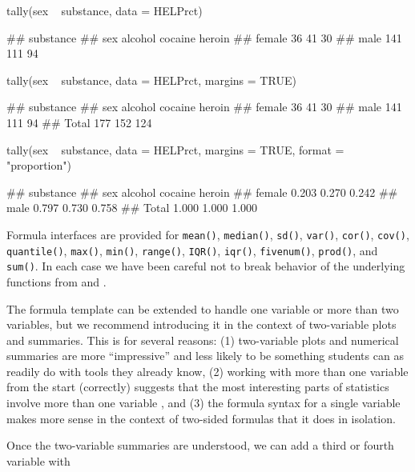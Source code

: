 \begin{Schunk}
\begin{Sinput}
tally(sex ~ substance, data = HELPrct)
\end{Sinput}
\begin{Soutput}
##         substance
## sex      alcohol cocaine heroin
##   female      36      41     30
##   male       141     111     94
\end{Soutput}
\begin{Sinput}
tally(sex ~ substance, data = HELPrct, margins = TRUE)
\end{Sinput}
\begin{Soutput}
##         substance
## sex      alcohol cocaine heroin
##   female      36      41     30
##   male       141     111     94
##   Total      177     152    124
\end{Soutput}
\begin{Sinput}
tally(sex ~ substance, data = HELPrct, margins = TRUE, format = "proportion")
\end{Sinput}
\begin{Soutput}
##         substance
## sex      alcohol cocaine heroin
##   female   0.203   0.270  0.242
##   male     0.797   0.730  0.758
##   Total    1.000   1.000  1.000
\end{Soutput}
\end{Schunk}

Formula interfaces are provided for \texttt{mean()}, \texttt{median()},
\texttt{sd()}, \texttt{var()}, \texttt{cor()}, \texttt{cov()},
\texttt{quantile()}, \texttt{max()}, \texttt{min()}, \texttt{range()},
\texttt{IQR()}, \texttt{iqr()}, \texttt{fivenum()}, \texttt{prod()}, and
\texttt{sum()}. In each case we have been careful not to break behavior
of the underlying functions from  and .

The formula template can be extended to handle one variable or more than
two variables, but we recommend introducing it in the context of
two-variable plots and summaries. This is for several reasons: (1)
two-variable plots and numerical summaries are more ``impressive'' and
less likely to be something students can as readily do with tools they
already know, (2) working with more than one variable from the start
(correctly) suggests that the most interesting parts of statistics
involve more than one variable \citep{Wild:RSS:2011}, and (3) the
formula syntax for a single variable makes more sense in the context of
two-sided formulas that it does in isolation.

Once the two-variable summaries are understood, we can add a third or
fourth variable with

